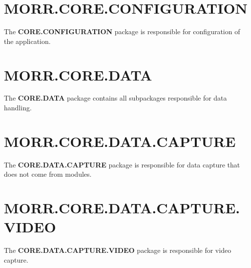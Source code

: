 \section*{MORR.CORE.CONFIGURATION}

The \textbf{CORE.CONFIGURATION} package is responsible for configuration of the application.

\begin{packif}
\end{packif}

\begin{packclass}
\end{packclass}

\section*{MORR.CORE.DATA}

The \textbf{CORE.DATA} package contains all subpackages responsible for data handling.

\begin{packpack}
\end{packpack}

\section*{MORR.CORE.DATA.CAPTURE}

The \textbf{CORE.DATA.CAPTURE} package is responsible for data capture that does not come from modules.

\begin{packclass}
\end{packclass}

\begin{packpack}
\end{packpack}

\section*{MORR.CORE.DATA.CAPTURE.VIDEO}

The \textbf{CORE.DATA.CAPTURE.VIDEO} package is responsible for video capture.

\begin{packclass}
\end{packclass}


